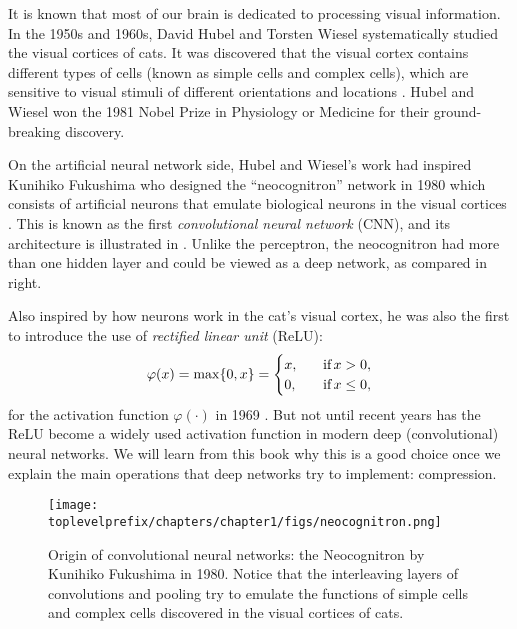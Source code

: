 \documentclass[../../book-main.tex]{subfiles}
\begin{document}
It is known that most of our brain is dedicated to processing visual information. In the 1950s and 1960s, David Hubel and Torsten Wiesel systematically studied the visual cortices of cats. It was discovered that the visual cortex contains different types of cells (known as simple cells and complex cells), which are sensitive to visual stimuli of different orientations and locations \cite{Hubel-Wiesel-1959}. Hubel and Wiesel won the 1981 Nobel Prize in Physiology or Medicine for their ground-breaking discovery. 


On the artificial neural network side, Hubel and Wiesel's work had inspired Kunihiko Fukushima who designed the ``neocognitron'' network in 1980 which consists of artificial neurons that emulate biological neurons in the visual cortices \cite{Fukushima1980NeocognitronAS}. This is known as the first {\em convolutional neural network} (CNN), and its architecture is illustrated in . Unlike the perceptron, the neocognitron had more than one hidden layer and could be viewed as a deep network, as compared in  right.

Also inspired by how neurons work in the cat's visual cortex, he was also the first to introduce the use of {\em rectified linear unit} (ReLU):
\begin{equation}
    \varphi(x) = \max\{0, x\} = \begin{cases}x, & \text{if} \, x > 0, \\ 0, \quad & \text{if} \, x \leq 0,\end{cases}
\end{equation}
for the activation function $\varphi(\cdot)$ in 1969 \cite{Fukushima-1969}. But not until recent years has the ReLU become a widely used activation function in modern deep (convolutional) neural networks. We will learn from this book why this is a good choice once we explain the main operations that deep networks try to implement: compression. 

\begin{figure}
    \centering
    \texttt{[image: \\toplevelprefix/chapters/chapter1/figs/neocognitron.png]}
    \caption{Origin of convolutional neural networks: the Neocognitron by Kunihiko Fukushima in 1980. Notice that the interleaving layers of convolutions and pooling try to emulate the functions of simple cells and complex cells discovered in the visual cortices of cats.}
    \label{fig:neocognitron}
\end{figure}
\end{document}
